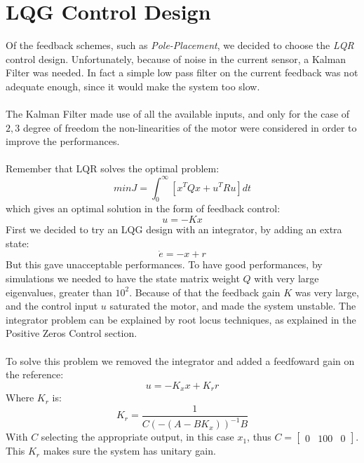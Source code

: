 \section{LQG Control Design}
Of the feedback schemes, such as \emph{Pole-Placement}, we decided to choose the \emph{LQR} control design. Unfortunately, because of noise in the current sensor, a Kalman Filter was needed. In fact a simple low pass filter on the current feedback was not adequate enough, since it would make the system too slow.\\ \\
The Kalman Filter made use of all the available inputs, and only for the case of $2,3$ degree of freedom the non-linearities of the motor were considered in order to improve the performances. \\ \\
Remember that LQR solves the optimal problem:
\begin{equation}
min J = \int_0^{\infty} [x^T Q x + u^T R u] dt
\end{equation}
which gives an optimal solution in the form of feedback control:
\begin{equation}
u=-Kx
\end{equation}
First we decided to try an LQG design with an integrator, by adding an extra state: 
\begin{equation}
\dot{e} = -x+r
\end{equation}
But this gave unacceptable performances. To have good performances, by simulations we needed to have the state matrix weight $Q$ with very large eigenvalues, greater than $10^2$. Because of that the feedback gain $K$ was very large, and the control input $u$ saturated the motor, and made the system unstable. The integrator problem can be explained by root locus techniques, as explained in the Positive Zeros Control section. \\ \\
To solve this problem we removed the integrator and added a feedfoward gain on the reference:
\begin{equation}
u=-K_{x} x+ K_{r} r
\end{equation}
Where $K_{r}$ is:
\begin{equation}
K_{r} = \frac{1}{C(-(A-BK_x))^{-1}B}
\end{equation}
With $C$ selecting the appropriate output, in this case $x_1$, thus $C=\begin{bmatrix}0 & 100 & 0\end{bmatrix}$. This $K_r$ makes sure the system has unitary gain. \\
